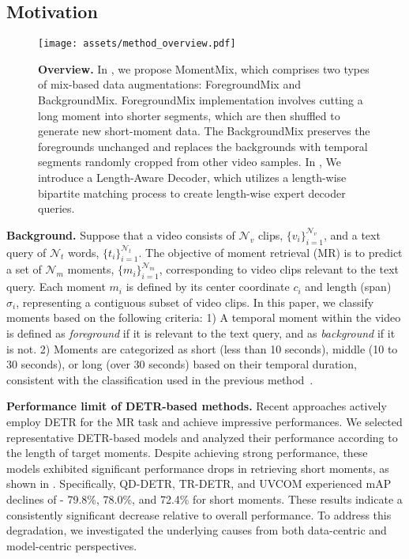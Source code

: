 \subsection{Motivation}

\begin{figure*}[tb]
    \centering
    \texttt{[image: assets/method\_overview.pdf]}
    \caption{\textbf{Overview.} In , we propose MomentMix, which comprises two types of mix-based data augmentations: ForegroundMix and BackgroundMix. ForegroundMix implementation involves cutting a long moment into shorter segments, which are then shuffled to generate new short-moment data. The BackgroundMix preserves the foregrounds unchanged and replaces the backgrounds with temporal segments randomly cropped from other video samples. In , We introduce a Length-Aware Decoder, which utilizes a length-wise bipartite matching process to create length-wise expert decoder queries.
    }
    \label{fig:method_overview}
\end{figure*}

\noindent\textbf{Background.} Suppose that a video consists of $\mathcal{N}_v$ clips, ${\{v_i\}}_{i=1}^{\mathcal{N}_v}$, and a text query of $\mathcal{N}_t$ words, ${\{t_i\}}_{i=1}^{\mathcal{N}_t}$.
The objective of moment retrieval (MR) is to predict a set of $\mathcal{N}_m$ moments, $\{m_i\}_{i=1}^{\mathcal{N}_m}$, corresponding to video clips relevant to the text query.
Each moment $m_i$ is defined by its center coordinate $c_i$ and length (span) $\sigma_i$, representing a contiguous subset of video clips. In this paper, we classify moments based on the following criteria: 1) A temporal moment within the video is defined as \textit{foreground} if it is relevant to the text query, and as \textit{background} if it is not. 2) Moments are categorized as short (less than 10 seconds), middle (10 to 30 seconds), or long (over 30 seconds) based on their temporal duration, consistent with the classification used in the previous method~\cite{lei2021detecting_Moment-DETR}.

\vspace{1mm}
\noindent\textbf{Performance limit of DETR-based methods.} Recent approaches actively employ DETR for the MR task and achieve impressive performances.
We selected representative DETR-based models and analyzed their performance according to the length of target moments. Despite achieving strong performance, these models exhibited significant performance drops in retrieving short moments, as shown in . 
Specifically, QD-DETR, TR-DETR, and UVCOM experienced mAP declines of - 79.8\%, 78.0\%, and 72.4\% for short moments. These results indicate a consistently significant decrease relative to overall performance. To address this degradation, we investigated the underlying causes from both data-centric and model-centric perspectives.
 

